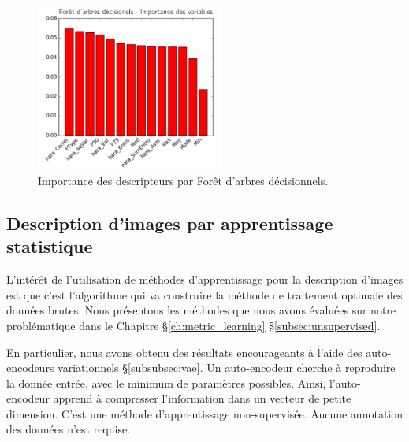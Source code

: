 \begin{figure}[hbt]
	\centering
	\includegraphics[width=0.55\textwidth,height=\textheight,keepaspectratio]{../Chap3/Figures/random_forest_importance.png}
	\caption{Importance des descripteurs par Forêt d'arbres décisionnels.}
	\label{fig:random_forest}
\end{figure}


\subsection{Description d'images par apprentissage statistique}
L'intérêt de l'utilisation de méthodes d'apprentissage pour la description d'images est que c'est l'algorithme qui va construire la méthode de traitement optimale des données brutes.
Nous présentons les méthodes que nous avons évaluées sur notre problématique dans le Chapitre §\ref{ch:metric_learning} §\ref{subsec:unsupervised}.

En particulier, nous avons obtenu des résultats encourageants à l'aide des auto-encodeurs variationnels §\ref{subsubsec:vae}.
Un auto-encodeur cherche à reproduire la donnée entrée, avec le minimum de paramètres possibles.
Ainsi, l'auto-encodeur apprend à compresser l'information dans un vecteur de petite dimension.
C'est une méthode d'apprentissage non-supervisée.
Aucune annotation des données n'est requise.

